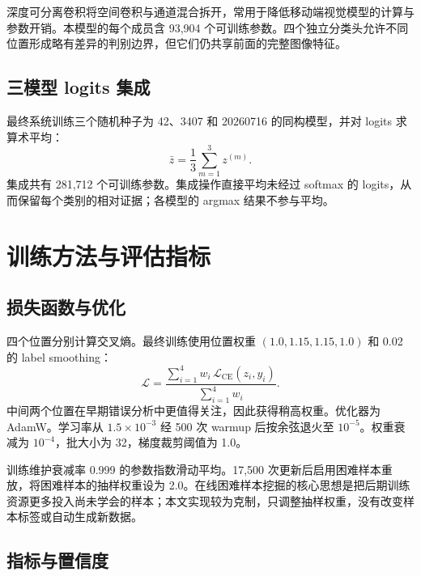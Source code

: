 \documentclass[UTF8,12pt,a4paper]{ctexart}
\begin{document}
深度可分离卷积将空间卷积与通道混合拆开，常用于降低移动端视觉模型的计算与参数开销\cite{howard2017mobilenets}。本模型的每个成员含 93,904 个可训练参数。四个独立分类头允许不同位置形成略有差异的判别边界，但它们仍共享前面的完整图像特征。

\subsection{三模型 logits 集成}

最终系统训练三个随机种子为 42、3407 和 20260716 的同构模型，并对 logits 求算术平均：
\begin{equation}
  \bar z=\frac{1}{3}\sum_{m=1}^{3}z^{(m)}.
\end{equation}
集成共有 281,712 个可训练参数。集成操作直接平均未经过 softmax 的 logits，从而保留每个类别的相对证据；各模型的 argmax 结果不参与平均。

\section{训练方法与评估指标}

\subsection{损失函数与优化}

四个位置分别计算交叉熵。最终训练使用位置权重 $(1.0,1.15,1.15,1.0)$ 和 0.02 的 label smoothing：
\begin{equation}
  \mathcal{L}=\frac{\sum_{i=1}^{4}w_i\,\mathcal{L}_{\mathrm{CE}}(z_i,y_i)}{\sum_{i=1}^{4}w_i}.
\end{equation}
中间两个位置在早期错误分析中更值得关注，因此获得稍高权重。优化器为 AdamW\cite{loshchilov2019adamw}。学习率从 $1.5\times10^{-3}$ 经 500 次 warmup 后按余弦退火至 $10^{-5}$。权重衰减为 $10^{-4}$，批大小为 32，梯度裁剪阈值为 1.0。

训练维护衰减率 0.999 的参数指数滑动平均。17,500 次更新后启用困难样本重放，将困难样本的抽样权重设为 2.0。在线困难样本挖掘的核心思想是把后期训练资源更多投入尚未学会的样本\cite{shrivastava2016ohem}；本文实现较为克制，只调整抽样权重，没有改变样本标签或自动生成新数据。

\subsection{指标与置信度}
\end{document}
